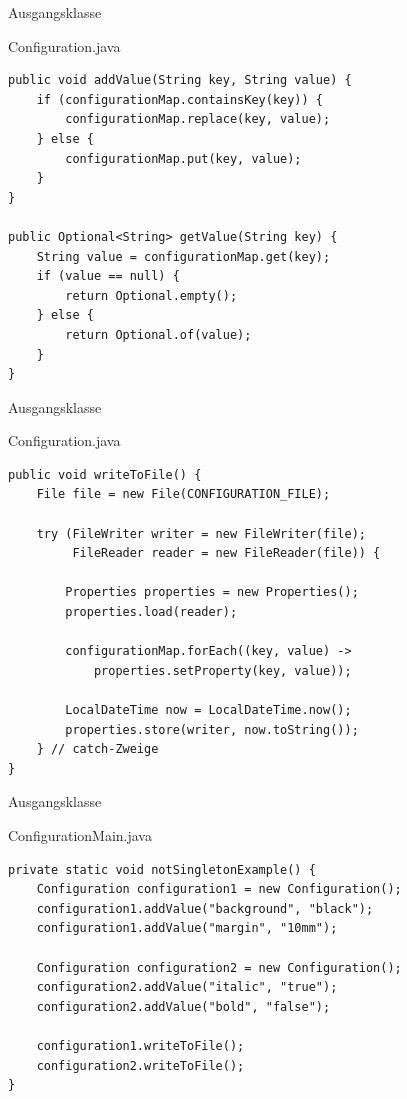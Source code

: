 \begin{frame}[fragile]{Ausgangsklasse}
	\begin{alertblock}{Configuration.java}
        \begin{lstlisting}
public void addValue(String key, String value) {
    if (configurationMap.containsKey(key)) {
        configurationMap.replace(key, value);
    } else {
        configurationMap.put(key, value);
    }
}

public Optional<String> getValue(String key) {
    String value = configurationMap.get(key);
    if (value == null) {
        return Optional.empty();
    } else {
        return Optional.of(value);
    }
}    
        \end{lstlisting} 		
 	\end{alertblock}
\end{frame}

\begin{frame}[fragile]{Ausgangsklasse}
	\begin{alertblock}{Configuration.java}
        \begin{lstlisting}
public void writeToFile() {
    File file = new File(CONFIGURATION_FILE);

    try (FileWriter writer = new FileWriter(file);
         FileReader reader = new FileReader(file)) {

        Properties properties = new Properties();
        properties.load(reader);
        
        configurationMap.forEach((key, value) -> 
            properties.setProperty(key, value));

        LocalDateTime now = LocalDateTime.now();
        properties.store(writer, now.toString());
    } // catch-Zweige
}   
        \end{lstlisting} 		
 	\end{alertblock}
\end{frame}

\begin{frame}[fragile]{Ausgangsklasse}
	\begin{alertblock}{ConfigurationMain.java}
        \begin{lstlisting}
private static void notSingletonExample() {
    Configuration configuration1 = new Configuration();
    configuration1.addValue("background", "black");
    configuration1.addValue("margin", "10mm");

    Configuration configuration2 = new Configuration();
    configuration2.addValue("italic", "true");
    configuration2.addValue("bold", "false");
    
    configuration1.writeToFile();
    configuration2.writeToFile();
}            
        \end{lstlisting}
 	\end{alertblock}
\end{frame}

